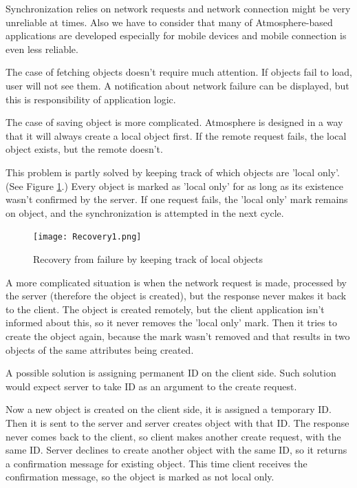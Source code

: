Synchronization relies on network requests and network connection might be very unreliable at times. Also we have to consider that many of Atmosphere-based applications are developed especially for mobile devices and mobile connection is even less reliable.

The case of fetching objects doesn't require much attention. If objects fail to load, user will not see them. A notification about network failure can be displayed, but this is responsibility of application logic.

The case of saving object is more complicated. Atmosphere is designed in a way that it will always create a local object first. If the remote request fails, the local object exists, but the remote doesn't.

This problem is partly solved by keeping track of which objects are 'local only'. (See Figure \ref{fig:recovery1}.) Every object is marked as 'local only' for as long as its existence wasn't confirmed by the server.  If one request fails,  the 'local only' mark remains on object,  and the synchronization is attempted in the next cycle. 

\begin{figure}[htbp]
  \centering
    \texttt{[image: Recovery1.png]}
  \caption{Recovery from failure by keeping track of local objects}
  \label{fig:recovery1}
\end{figure}

A more complicated situation is when the network request is made, processed by the server (therefore the object is created), but the response never makes it back to the client. The object is created remotely, but the client application isn’t informed about this, so it never removes the 'local only' mark. Then it tries to create the object again, because the mark wasn't removed and that results in two objects of the same attributes being created.

A possible solution is assigning permanent ID on the client side. Such solution would expect server to take ID as an argument to the create request.

Now a new object is created on the client side, it is assigned a temporary ID. Then it is sent to the server and server creates object with that ID. The response never comes back to the client, so client makes another create request, with the same ID. Server declines to create another object with the same ID, so it returns a confirmation message for existing object. This time client receives the confirmation message, so the object is marked as not local only.

